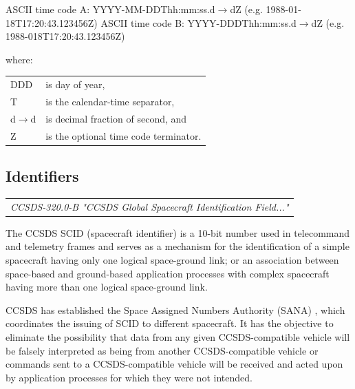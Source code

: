 ASCII time code A: YYYY-MM-DDThh:mm:ss.d$\rightarrow$dZ (e.g. 1988-01-18T17:20:43.123456Z)
ASCII time code B: YYYY-DDDThh:mm:ss.d$\rightarrow$dZ (e.g. 1988-018T17:20:43.123456Z)

where:

\begin{tabular}{l l}
DDD & is day of year, \\
T & is the calendar-time separator, \\
d$\rightarrow$d & is decimal fraction of second, and \\
Z & is the optional time code terminator.
\end{tabular}
 
\subsection{Identifiers}

\begin{tabular}{l}
\textit{CCSDS-320.0-B "CCSDS Global Spacecraft Identification Field..." \cite{CCSDS-320.0-B}} \\
\end{tabular}

The CCSDS SCID (spacecraft identifier) is a 10-bit number used in telecommand and telemetry frames and serves as a mechanism for the identification of a simple spacecraft having only one logical space-ground link; or an association between space-based and ground-based application processes with complex spacecraft having more than one logical space-ground link.

CCSDS has established the Space Assigned Numbers Authority (SANA) \cite{sanaregistry.org}, which coordinates the issuing of SCID to different spacecraft. It has the objective to eliminate the possibility that data from any given CCSDS-compatible vehicle will be falsely interpreted as being from another CCSDS-compatible vehicle or commands sent to a CCSDS-compatible vehicle will be received and acted upon by application processes for which they were not intended.
